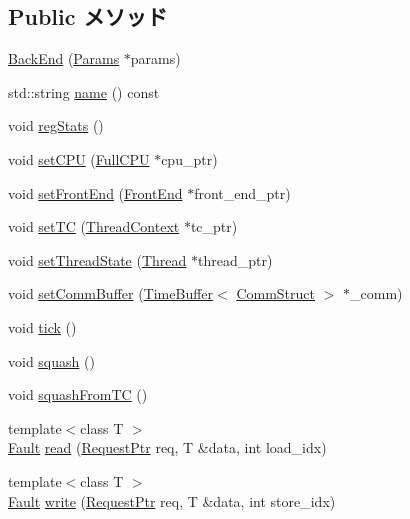 \subsection*{Public メソッド}
\begin{DoxyCompactItemize}
\item 
\hyperlink{classBackEnd_a8698a618ba78dbd457f2cee79a739588}{BackEnd} (\hyperlink{classBackEnd_a818e103eae798a24a06a0a34631849ea}{Params} $\ast$params)
\item 
std::string \hyperlink{classBackEnd_a37627d5d5bba7f4a8690c71c2ab3cb07}{name} () const 
\item 
void \hyperlink{classBackEnd_a4dc637449366fcdfc4e764cdf12d9b11}{regStats} ()
\item 
void \hyperlink{classBackEnd_ad491c9766121fc19aa77fd0723e7641d}{setCPU} (\hyperlink{classBackEnd_a90ba84e54618cc07f2e8f05e046cb5ce}{FullCPU} $\ast$cpu\_\-ptr)
\item 
void \hyperlink{classBackEnd_a122009fa2730cee3898ac945227da8eb}{setFrontEnd} (\hyperlink{classFrontEnd}{FrontEnd} $\ast$front\_\-end\_\-ptr)
\item 
void \hyperlink{classBackEnd_ac6ccaaea6ac518cab92f71723b5a739e}{setTC} (\hyperlink{classThreadContext}{ThreadContext} $\ast$tc\_\-ptr)
\item 
void \hyperlink{classBackEnd_a850bea4a9b9f631e7b6a4c7dc92f662a}{setThreadState} (\hyperlink{structOzoneThreadState}{Thread} $\ast$thread\_\-ptr)
\item 
void \hyperlink{classBackEnd_aeabdb9f0aae07df67c3029f8fddb2693}{setCommBuffer} (\hyperlink{classTimeBuffer}{TimeBuffer}$<$ \hyperlink{classBackEnd_a82fb3c7183ba777a05c510ab2fbcfb82}{CommStruct} $>$ $\ast$\_\-comm)
\item 
void \hyperlink{classBackEnd_a873dd91783f9efb4a590aded1f70d6b0}{tick} ()
\item 
void \hyperlink{classBackEnd_a3c68c455d9207edd23ae3bcb7971e653}{squash} ()
\item 
void \hyperlink{classBackEnd_a24cd8db837a73b879041bf33da7b2064}{squashFromTC} ()
\item 
{\footnotesize template$<$class T $>$ }\\\hyperlink{classRefCountingPtr}{Fault} \hyperlink{classBackEnd_a0747777ac998dabdc20fa0c554d378d3}{read} (\hyperlink{classRequest}{RequestPtr} req, T \&data, int load\_\-idx)
\item 
{\footnotesize template$<$class T $>$ }\\\hyperlink{classRefCountingPtr}{Fault} \hyperlink{classBackEnd_abbf7bcc93511421a1787650a43e2642a}{write} (\hyperlink{classRequest}{RequestPtr} req, T \&data, int store\_\-idx)

\end{DoxyCompactItemize}
